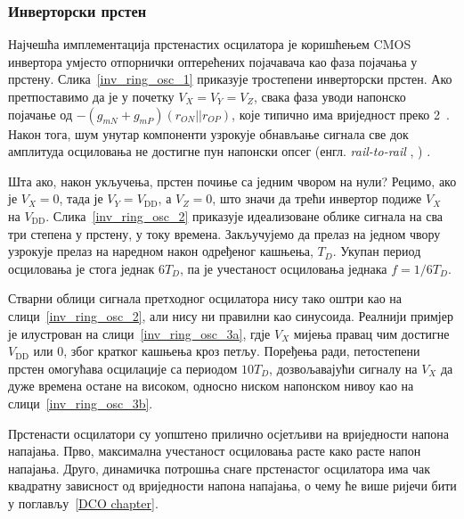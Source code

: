 \documentclass[master]{finthesis}
\makeatletter
\newcommand*{\engl}[2][\@empty]{%
    \edef\theacronym{#1}%
    (енгл. \foreignlanguage{english}{\emph{#2}%
    \ifx\theacronym\@empty \else , #1\fi})%
}
\makeatother
\begin{document}
\subsubsection{Инверторски прстен} \label{section:osc:ring_osc:inv_ring}
Најчешћа имплементација прстенастих осцилатора је коришћењем CMOS инвертора умјесто отпорнички оптерећених појачавача као фаза појачања у прстену. Слика~\ref{inv_ring_osc_1} приказује тростепени инверторски прстен. Ако претпоставимо да је у почетку $V_{X} = V_{Y} = V_{Z}$, свака фаза уводи напонско појачање од $-(g_{mN}+g_{mP})(r_{ON}||r_{OP})$, које типично има вриједност преко 2~\cite{Razavi:PLL_CMOS_2020}. Након тога, шум унутар компоненти узрокује обнављање сигнала све док амплитуда осциловања не достигне пун напонски опсег \engl{rail-to-rail}. \par

Шта ако, након укључења, прстен почиње са једним чвором на нули? Рецимо, ако је $V_{X}=0$, тада је $V_{Y}=V_\text{DD}$, а $V_{Z}=0$, што значи да трећи инвертор подиже $V_{X}$ на $V_\text{DD}$. Слика~\ref{inv_ring_osc_2} приказује идеализоване облике сигнала на сва три степена у прстену, у току времена. Закључујемо да прелаз на једном чвору узрокује прелаз на наредном након одређеног кашњења, $T_{D}$. Укупан период осциловања је стога једнак $6T_{D}$, па је учестаност осциловања једнака $f=1/6T_{D}$.\par

Стварни облици сигнала претходног осцилатора нису тако оштри као на слици~\ref{inv_ring_osc_2}, али нису ни правилни као синусоида. Реалнији примјер је илустрован на слици~\ref{inv_ring_osc_3a}, гдје $V_{X}$ мијења правац чим достигне $V_\text{DD}$ или 0, због кратког кашњења кроз петљу. Поређења ради, петостепени прстен омогућава осцилације са периодом $10T_{D}$, дозвољавајући сигналу на $V_{X}$ да дуже времена остане на високом, односно ниском напонском нивоу као на слици~\ref{inv_ring_osc_3b}. \par

Прстенасти осцилатори су уопштено прилично осјетљиви на вриједности напона напајања. Прво, максимална учестаност осциловања расте како расте напон напајања. Друго, динамичка потрошња снаге прстенастог осцилатора има чак квадратну зависност од вриједности напона напајања, о чему ће више ријечи бити у поглављу~\ref{DCO chapter}.
\end{document}
